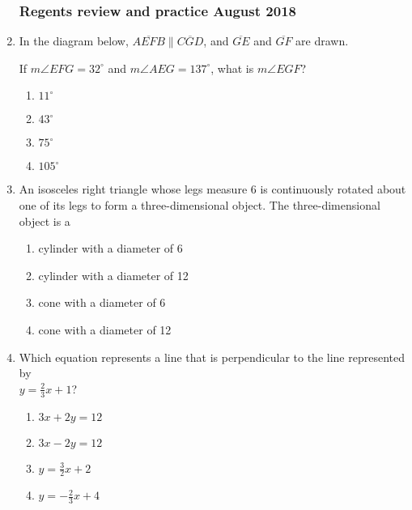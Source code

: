 \documentclass[12pt, oneside]{article}
\begin{document}
\begin{enumerate}[itemsep=2cm]
\subsubsection*{Regents review and practice \hfill August 2018}
\item In the diagram below, $\overline{AEFB} \parallel \overline{CGD}$, and $\overline{GE}$ and $\overline{GF}$ are drawn.
\begin{center}
  \end{center}
If $m\angle EFG = 32^\circ$ and $m\angle AEG = 137^\circ$, what is $m\angle EGF$?
\begin{multicols}{2}
  \begin{enumerate}
    \item $11^\circ$
    \item $43^\circ$
    \item $75^\circ$
    \item $105^\circ$
  \end{enumerate}
\end{multicols}

\newpage
\item An isosceles right triangle whose legs measure 6 is continuously rotated about one of its legs to form a three-dimensional object. The three-dimensional object is a
  \begin{enumerate}
    \item cylinder with a diameter of 6
    \item cylinder with a diameter of 12
    \item cone with a diameter of 6
    \item cone with a diameter of 12
  \end{enumerate}

\item Which equation represents a line that is perpendicular to the line represented by\\ $\displaystyle y=\frac{2}{3}x+1$?
\begin{multicols}{2}
  \begin{enumerate}
    \item $3x+2y=12$
    \item $3x-2y=12$ 
    \item $\displaystyle y=\frac{3}{2}x+2$
    \item $\displaystyle y=-\frac{2}{3}x+4$
  \end{enumerate}
\end{multicols}


\end{enumerate}
\end{document}
